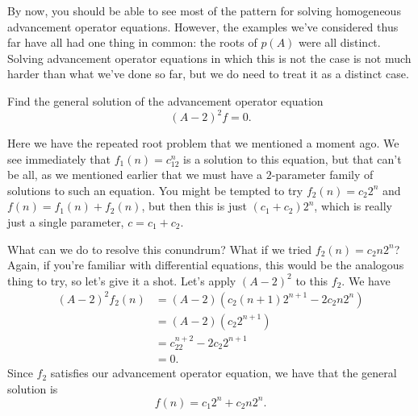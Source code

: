 By now, you should be able to see most of the pattern for solving
homogeneous advancement operator equations. However, the examples
we've considered thus far have all had one thing in common: the roots
of $p(A)$ were all distinct. Solving advancement operator equations in
which this is not the case is not much harder than what we've done so
far, but we do need to treat it as a distinct case.

\begin{example}\label{ex:recurrence:deg2-repeated}
  Find the general solution of the advancement operator equation
  \[(A-2)^2 f=0.\]
  
  Here we have the repeated root problem that we mentioned a moment
  ago. We see immediately that $f_1(n) = c_12^n$ is a solution to this
  equation, but that can't be all, as we mentioned earlier that we
  must have a $2$-parameter family of solutions to such an
  equation. You might be tempted to try $f_2(n) = c_2 2^n$ and $f(n) =
  f_1(n) + f_2(n)$, but then this is just $(c_1+c_2)2^n$, which is
  really just a single parameter, $c=c_1+c_2$.

  What can we do to resolve this conundrum? What if we tried $f_2(n) =
  c_2 n2^n$? Again, if you're familiar with differential equations,
  this would be the analogous thing to try, so let's give it a
  shot. Let's apply $(A-2)^2$ to this $f_2$. We have
  \begin{align*}
    (A-2)^2 f_2(n) &= (A-2)(c_2(n+1)2^{n+1} - 2c_2 n2^n)\\
    & = (A-2)(c_2 2^{n+1})\\
    & = c_22^{n+2} - 2c_2 2^{n+1}\\
    & = 0.
  \end{align*}
  Since $f_2$ satisfies our advancement operator equation, we have
  that the general solution is
  \[f(n) = c_1 2^n + c_2 n2^n.\]
\end{example}

